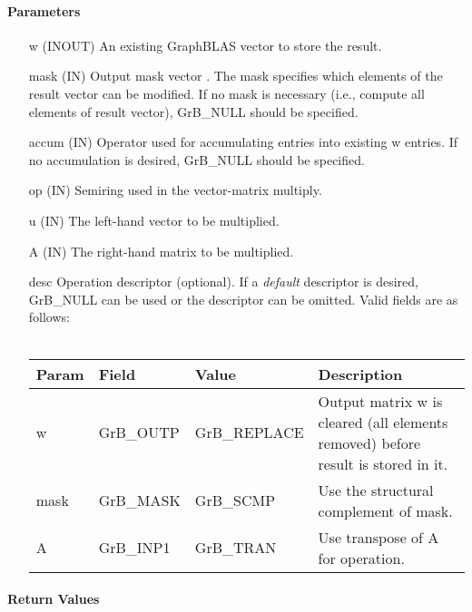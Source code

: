 \paragraph{Parameters}

\begin{itemize}[leftmargin=1.1in]
    \item[{\sf w}]    ({\sf INOUT}) An existing GraphBLAS vector to store the result.

    \item[{\sf mask}] ({\sf IN}) Output mask vector . The mask
    specifies which elements of the result vector can be modified.
    If no mask is necessary (i.e., compute all elements of result
    vector), {\sf GrB\_NULL} should be specified.

    \item[{\sf accum}]  ({\sf IN}) Operator used for accumulating entries into existing
                        {\sf w} entries. If no accumulation is desired,
                        {\sf GrB\_NULL} should be specified.

    \item[{\sf op}]   ({\sf IN}) Semiring used in the vector-matrix multiply.
    \item[{\sf u}]    ({\sf IN}) The left-hand vector to be multiplied.
    \item[{\sf A}]    ({\sf IN}) The right-hand matrix to be multiplied.

    \item[{\sf desc}]  Operation descriptor (optional). If a
    \emph{default} descriptor is desired, {\sf GrB\_NULL} can be
    used or the descriptor can be omitted. Valid fields are as follows: \\ ~\\
    \begin{tabular}{lllp{2.5in}}
    Param & Field  & Value & Description \\
    \hline
    {\sf w}    & {\sf GrB\_OUTP} & {\sf GrB\_REPLACE} & Output matrix {\sf w} is cleared (all elements removed) before result is stored in it.\\
    {\sf mask} & {\sf GrB\_MASK} & {\sf GrB\_SCMP}   & Use the structural complement of {\sf mask}. \\
    {\sf A}    & {\sf GrB\_INP1} & {\sf GrB\_TRAN}   & Use transpose of {\sf A} for operation. \\
    \end{tabular}
\end{itemize}

\paragraph{Return Values}

